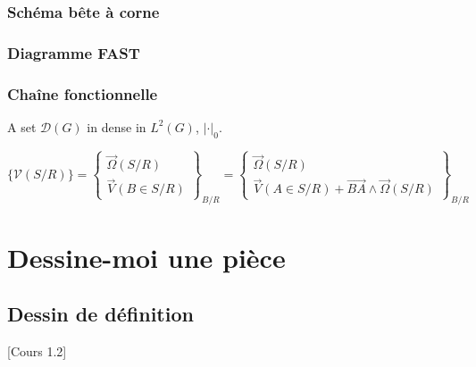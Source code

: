 \documentclass[
	11pt, %
	fleqn, %
	a4paper, %
]{LegrandOrangeBook}
\begin{document}
\subsection{Schéma bête à corne}
\subsection{Diagramme FAST}
\subsection{Chaîne fonctionnelle}

\begin{theorem} %
	A set $\mathcal{D}(G)$ in dense in $L^2(G)$, $|\cdot|_0$. 
\end{theorem}


$\{ \mathcal{V} (S/R) \}
= \left\{ \begin{array}{c}
     \overrightarrow{\Omega} (S/R) \\
     \overrightarrow{V} (B \in S/R)
\end{array} \right\} _{B/R}
= \left\{ \begin{array}{c}
     \overrightarrow{\Omega} (S/R) \\
     \overrightarrow{V} (A \in S/R) +\overrightarrow{BA} \wedge \overrightarrow{\Omega}(S/R)
\end{array} \right\} _{B/R}$


\chapterspaceabove{6.25cm} %
\chapterspacebelow{7.5cm} %


\chapter{Dessine-moi une pièce}

\section{Dessin de définition}
[Cours 1.2]
\end{document}
